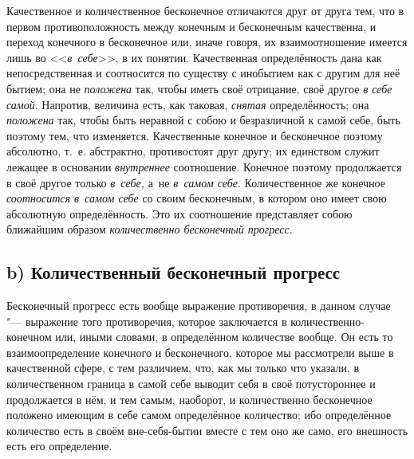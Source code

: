 Качественное и количественное бесконечное отличаются друг от друга тем, что
в первом противоположность между конечным и бесконечным качественна, и переход
конечного в бесконечное или, иначе говоря, их взаимоотношение имеется лишь во
<<{\em в~себе}>>, в их понятии. Качественная определённость дана как
непосредственная и соотносится по существу с инобытием как с другим для неё
бытием; она не {\em положена} так, чтобы иметь своё отрицание, своё другое
{\em в себе самой}. Напротив, величина есть, как таковая, {\em снятая}
определённость; она {\em положена} так, чтобы быть неравной с собою и
безразличной к самой себе, быть поэтому тем, что изменяется. Качественные
конечное и бесконечное поэтому абсолютно, т.~е. абстрактно, противостоят друг
другу; их единством служит лежащее в основании {\em внутреннее} соотношение.
Конечное поэтому продолжается в своё другое только {\em в~себе,} а~не
{\em в~самом себе}. Количественное же конечное {\em соотносится в~самом себе}
со своим бесконечным, в котором оно имеет свою абсолютную определённость. Это
их соотношение представляет собою ближайшим образом
{\em количественно бесконечный прогресс}.

\subsection[b) Количественный бесконечный прогресс]%
{b) Количественный бесконечный прогресс}

Бесконечный прогресс есть вообще выражение противоречия, в данном случае "---
выражение того противоречия, которое заключается в количественно-конечном или,
иными словами, в определённом количестве вообще. Он есть то взаимоопределение
конечного и бесконечного, которое мы рассмотрели выше в качественной сфере,
с тем различием, что, как мы только что указали, в количественном граница
в самой себе выводит себя в своё потустороннее и продолжается в нём, и тем
самым, наоборот, и количественно бесконечное положено имеющим в себе самом
определённое количество; ибо определённое количество есть в своём
вне-себя-бытии вместе с тем оно же само, его внешность есть его определение.

